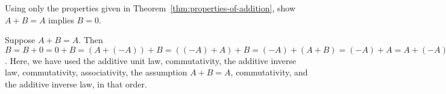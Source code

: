 \begin{enumialphparenastyle}
\begin{ex} Using only the properties given in
  Theorem~\ref{thm:properties-of-addition}, show $A+B=A$ implies $B=0$.
  \begin{sol}
    Suppose $A+B=A$. Then $B=B+0=0+B=(A+(-A))+B = ((-A)+A)+B =
    (-A)+(A+B) = (-A)+A = A+(-A) = 0$. Here, we have used the additive
    unit law, commutativity, the additive inverse law, commutativity,
    associativity, the assumption $A+B=A$, commutativity, and the
    additive inverse law, in that order.
  \end{sol}
\end{ex}

\end{enumialphparenastyle}
